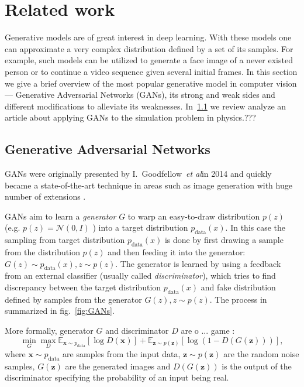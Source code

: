 \documentclass{webofc}
\makeatletter
\newcommand{\onedot}{\futurelet\@let@token\@onedot}
\newcommand{\etal}{\emph{et al}\onedot}
\newcommand{\vx}{\mathbf{x}}
\newcommand{\vz}{\mathbf{z}}
\newcommand{\pdata}{\ensuremath{p_{\text{data}}}}
\makeatother
\begin{document}
\section{Related work}
Generative models are of great interest in deep learning. With these models one can approximate a very complex distribution defined by a set of its samples. For example, such models can be utilized to generate a face image of a never existed person or to continue a video sequence given several initial frames. In this section we give a brief overview of the most popular generative model in computer vision — Generative Adversarial Networks (GANs), its strong and weak sides and different modifications to alleviate its weaknesses. In~\cref{} we review analyze an article about applying GANs to the simulation problem in physics.???

\subsection{Generative Adversarial Networks}
GANs were originally presented by I.~Goodfellow~\etal in 2014 \cite{goodfellow2014generative} and quickly became a state-of-the-art technique in areas such as image generation \cite{radford2015unsupervised} with huge number of extensions \cite{1,2,3,4}.


GANs aim to learn a \textit{generator} $G$ to warp an easy-to-draw distribution $p(z)$ (e.g. $p(z) = \mathcal{N}(0, I)$ ) into a target distribution $\pdata(x)$. In this case the sampling from target distribution $\pdata(x)$ is done by first drawing a sample from the distribution $p(z)$ and then feeding it into the generator: $G(z) \sim \pdata(x), z\sim p(z)$. The generator is learned by using a feedback from an external classifier (usually called \textit{discriminator}), which tries to find discrepancy between the target distribution $\pdata(x)$ and fake distribution defined by samples from the generator $G(z), z\sim p(z)$. The process in summarized in fig.~\ref{fig:GANs}.

More formally, generator $G$ and discriminator $D$ are o ... game : 
\begin{equation}\label{eq:gan}
\min_G \max_D \mathbb{E}_{\vx \sim \pdata} [\log D(\vx)] + \mathbb{E}_{\vz \sim p(\vz)} [\log(1 - D(G(\vz)))],
\end{equation} 
where $\vx \sim \pdata$ are samples from the input data, $\vz \sim p(\vz)$ are the random noise samples, $G(\vz)$ are the generated images and $D(G(\vz))$ is the output of the discriminator specifying the probability of an input being real.
\end{document}

